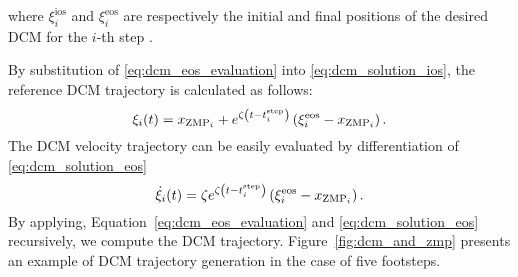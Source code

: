 where ${\xi}_{i}^{\text{ios}}$ and ${\xi}_{i}^{\text{eos}}$ are respectively the initial
and final positions of the desired DCM for the $i$-th step .
\par
By substitution of \eqref{eq:dcm_eos_evaluation} into \eqref{eq:dcm_solution_ios}, the reference DCM trajectory is calculated as follows:
\begin{equation}
  \label{eq:dcm_solution_eos}
  {\xi}_i(t) = {x}_{\text{ZMP}_i} + e ^{\zeta \left(t - t^\text{\text{step}}_i\right)} \left({\xi}^{\text{eos}}_i - {x}_{\text{ZMP}_i}\right).
\end{equation}
The DCM velocity trajectory can be easily evaluated by differentiation of \eqref{eq:dcm_solution_eos}
\begin{equation}
\dot{{\xi}}_i(t) =\zeta e ^{\zeta \left(t - t^\text{\text{step}}_i\right)} \left({\xi}^{\text{eos}}_i - {x}_{\text{ZMP}_i}\right).
\end{equation}
By applying, Equation~\eqref{eq:dcm_eos_evaluation} and  \eqref{eq:dcm_solution_eos} recursively, we compute the DCM trajectory. Figure~\ref{fig:dcm_and_zmp} presents an example of DCM trajectory generation in the case of five footsteps.


